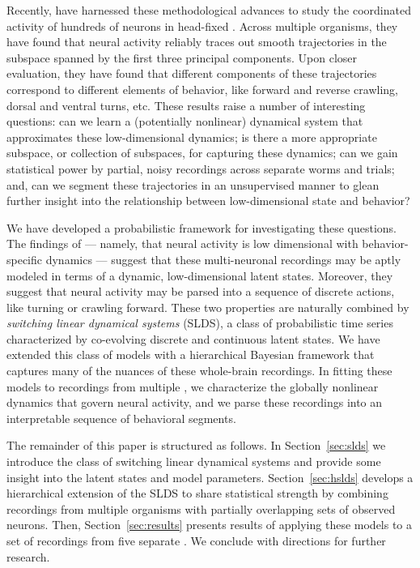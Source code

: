 \documentclass{article}
\begin{document}
Recently, \citet{kato2015global} have harnessed these methodological
advances to study the coordinated activity of hundreds of neurons
in head-fixed \celegans. Across multiple organisms, they have found that
neural activity reliably traces out smooth trajectories in the subspace
spanned by the first three principal components.
Upon closer evaluation, they have found that different components of these
trajectories correspond to different elements of behavior, like
forward and reverse crawling, dorsal and ventral turns, etc. These
results raise a number of interesting questions: can we learn a
(potentially nonlinear) dynamical system that approximates these
low-dimensional dynamics; is there a more appropriate subspace, or
collection of subspaces, for capturing these dynamics; can we gain
statistical power by partial, noisy recordings across separate worms
and trials; and, can we segment these trajectories in an unsupervised
manner to glean further insight into the relationship between
low-dimensional state and behavior?

We have developed a probabilistic framework for investigating these questions.
The findings of \citet{kato2015global} --- namely, that neural activity
is low dimensional with behavior-specific dynamics --- suggest that
these multi-neuronal recordings may be aptly modeled in terms of
a dynamic, low-dimensional latent states. Moreover, they suggest
that neural activity may be parsed into a sequence of discrete
actions, like turning or crawling forward. These two properties are
naturally combined by \emph{switching linear dynamical systems} (SLDS),
a class of probabilistic time series characterized by co-evolving
discrete and continuous latent states.  We have extended this
class of models with a hierarchical Bayesian framework that captures
many of the nuances of these whole-brain recordings. In fitting these
models to recordings from multiple \celegans, we characterize the
globally nonlinear dynamics that govern neural activity, and we
parse these recordings into an interpretable sequence of behavioral segments.

The remainder of this paper is structured as follows. In Section~\ref{sec:slds}
we introduce the class of switching linear dynamical systems and provide
some insight into the latent states and model parameters. Section~\ref{sec:hslds}
develops a hierarchical extension of the SLDS to share statistical
strength by combining recordings from multiple organisms with partially
overlapping sets of observed neurons.  Then, Section~\ref{sec:results}
presents results of applying these models to a set of recordings from
five separate \celegans. We conclude with directions for further research.
\end{document}
